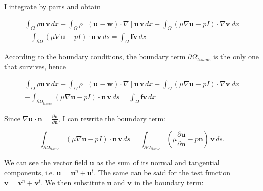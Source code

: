 \documentclass[11pt,a4paper,titlepage]{report}
\begin{document}
I integrate by parts and obtain 

\begin{align*}
 \int_{\Omega} \rho \dot{\mathbf{u}} \, \mathbf{v} \, dx
+ \int_{\Omega} \rho [(\mathbf{u - w}) \cdot \nabla] \mathbf{u} \, \mathbf{v} \, dx
+ \int_{\Omega} (\mu \nabla \mathbf{u} - pI) \cdot \nabla \mathbf{v} \, dx \\
- \int_{\partial \Omega} (\mu \nabla \mathbf{u} - pI) \cdot \mathbf{n} \, \mathbf{v} \, ds
= \int_{\Omega} \mathbf{f} \mathbf{v} \, dx
\end{align*}

According to the boundary conditions, the boundary term $\partial \Omega_{tissue}$ is the only one that survives, hence

\begin{align*}
 \int_{\Omega} \rho \dot{\mathbf{u}} \, \mathbf{v} \, dx
+ \int_{\Omega} \rho [(\mathbf{u - w}) \cdot \nabla] \mathbf{u} \, \mathbf{v} \, dx
+ \int_{\Omega} (\mu \nabla \mathbf{u} - pI) \cdot \nabla \mathbf{v} \, dx \\
- \int_{\partial \Omega_{tissue}} (\mu \nabla \mathbf{u} - pI) \cdot \mathbf{n} \, \mathbf{v} \, ds
= \int_{\Omega} \mathbf{f} \mathbf{v} \, dx
\end{align*}

Since $\nabla \mathbf{u} \cdot \mathbf{n} = \frac{\partial \mathbf{u}}{\partial \mathbf{n}}$, I can rewrite the boundary term:

\[
\int_{\partial \Omega_{tissue}} (\mu \nabla \mathbf{u} -  pI) \cdot \mathbf{n} \, \mathbf{v} \, ds = \int_{\partial \Omega_{tissue}} (\mu \frac{\partial \mathbf{u}}{\partial \mathbf{n}} -  p \mathbf{n}) \, \mathbf{v} \, ds.
\]


We can see the vector field $\mathbf{u}$ as the sum of its normal and tangential components, i.e. $\mathbf{u} = \mathbf{u}^n + \mathbf{u}^t$. The same can be said for the test function $\mathbf{v} = \mathbf{v}^n + \mathbf{v}^t$. We then substitute $\mathbf{u}$ and $\mathbf{v}$ in the boundary term:
\end{document}
